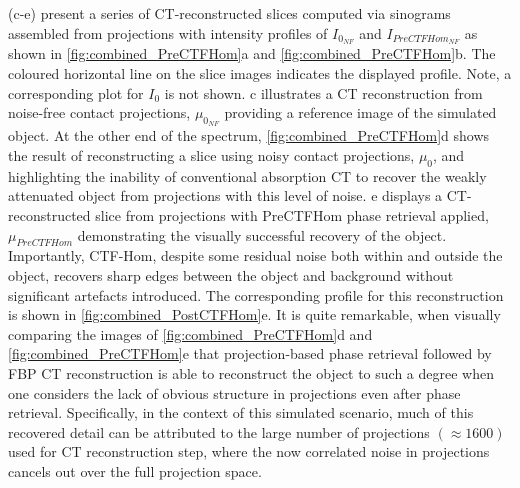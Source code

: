 \documentclass[twocolumn, switch]{article} %
\begin{document}
(c-e) present a series of CT-reconstructed slices computed via sinograms assembled from projections with intensity profiles of $I_{{0_{{NF}}}}$ and $I_{PreCTFHom_{NF}}$ as shown in \cref{fig:combined_PreCTFHom}a and \cref{fig:combined_PreCTFHom}b. The coloured horizontal line on the slice images indicates the displayed profile. Note, a corresponding plot for $I_{{0}}$ is not shown.
c illustrates a CT reconstruction from noise-free contact projections, $\mu_{0_{NF}}$ providing a reference image of the simulated object. At the other end of the spectrum, \cref{fig:combined_PreCTFHom}d shows the result of reconstructing a slice using noisy contact projections, $\mu_{0}$, and highlighting the inability of conventional absorption CT to recover the weakly attenuated object from projections with this level of noise.
e displays a CT-reconstructed slice from projections with PreCTFHom phase retrieval applied, $\mu_{PreCTFHom}$ demonstrating the visually successful recovery of the object. Importantly, CTF-Hom, despite some residual noise both within and outside the object, recovers sharp edges between the object and background without significant artefacts introduced. The corresponding profile for this reconstruction is shown in \cref{fig:combined_PostCTFHom}e. It is quite remarkable, when visually comparing the images of \cref{fig:combined_PreCTFHom}d and \cref{fig:combined_PreCTFHom}e that projection-based phase retrieval followed by FBP CT reconstruction is able to reconstruct the object to such a degree when one considers the lack of obvious structure in projections even after phase retrieval. Specifically, in the context of this simulated scenario, much of this recovered detail can be attributed to the large number of projections $(\approx 1600)$ used for CT reconstruction step, where the now correlated noise in projections cancels out over the full projection space.
\end{document}
